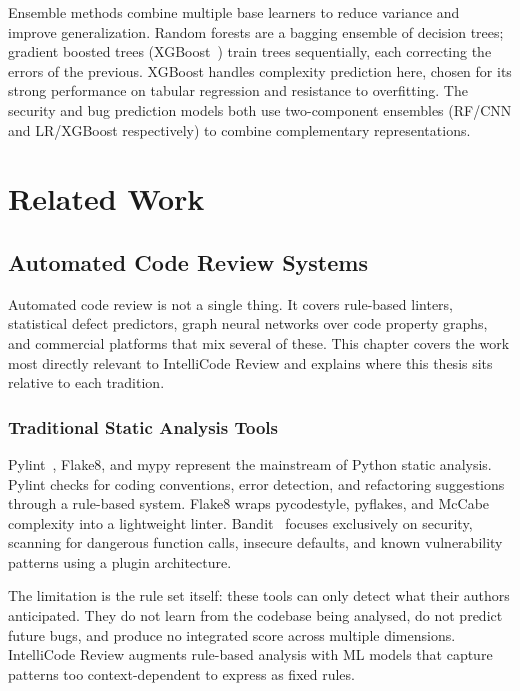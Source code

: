 \documentclass[12pt, oneside]{report}
\begin{document}
Ensemble methods combine multiple base learners to reduce variance and improve
generalization. Random forests are a bagging ensemble of decision trees; gradient
boosted trees (XGBoost~\cite{chen2016}) train trees sequentially, each correcting
the errors of the previous. XGBoost handles complexity prediction here, chosen for its strong performance on tabular regression and resistance to
overfitting. The security and bug prediction models both use two-component ensembles
(RF/CNN and LR/XGBoost respectively) to combine complementary representations.

\chapter{Related Work}
\label{ch:related}

\section{Automated Code Review Systems}
\label{sec:rel-review}

Automated code review is not a single thing. It covers rule-based linters, statistical
defect predictors, graph neural networks over code property graphs, and commercial
platforms that mix several of these. This chapter covers the work most directly relevant
to IntelliCode Review and explains where this thesis sits relative to each tradition.

\subsection{Traditional Static Analysis Tools}

Pylint~\cite{pylint}, Flake8, and mypy represent the mainstream of Python static analysis.
Pylint checks for coding conventions, error detection, and refactoring suggestions through
a rule-based system. Flake8 wraps pycodestyle, pyflakes, and McCabe complexity into a
lightweight linter. Bandit~\cite{bandit} focuses exclusively on security, scanning for
dangerous function calls, insecure defaults, and known vulnerability patterns using
a plugin architecture.

The limitation is the rule set itself: these tools can only detect what their authors
anticipated. They do not learn from the codebase being analysed, do not predict future
bugs, and produce no integrated score across multiple dimensions. IntelliCode Review
augments rule-based analysis with ML models that capture patterns too context-dependent
to express as fixed rules.
\end{document}
